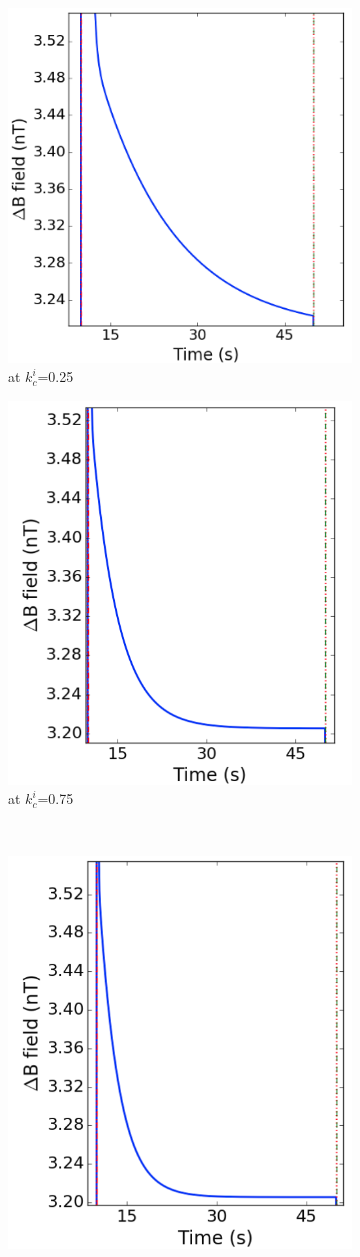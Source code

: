 \begin{figure}[!htb]
    \begin{subfigure}{.5\linewidth}
        \centering
        \includegraphics[width=\linewidth, height= 6.5 cm]{Images/i25_33_zoom.png}
        \caption{at $k_c^i$=0.25}
        \label{fig:i25zoom}
    \end{subfigure}%
    \begin{subfigure}{.5\linewidth}
        \centering
        \includegraphics[width=\linewidth, height= 6.5 cm]{Images/i75_33_zoom.png}
        \caption{at $k_c^i$=0.75}
        \label{fig:i75zoom}
    \end{subfigure}\\[1ex]
    \begin{subfigure}{.5\linewidth}
        \centering
        \includegraphics[width=\linewidth, height= 6.5 cm]{Images/i100_33_zoom.png}

\end{subfigure}
\end{figure}
